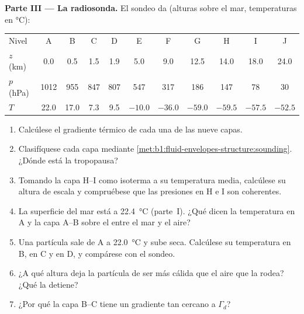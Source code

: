 \begin{problem}
\medskip
\noindent\textbf{Parte III --- La radiosonda.} El sondeo da (alturas sobre
el mar, temperaturas en \si{\celsius}):
\begin{center}
\small
\setlength{\tabcolsep}{4pt}
\begin{tabular}{|l|cccccccccc|}
\hline
Nivel & A & B & C & D & E & F & G & H & I & J \\
$z$ (km) & 0.0 & 0.5 & 1.5 & 1.9 & 5.0 & 9.0 & 12.5 & 14.0 & 18.0 & 24.0 \\
$p$ (hPa) & 1012 & 955 & 847 & 807 & 547 & 317 & 186 & 147 & 78 & 30 \\
$T$ & 22.0 & 17.0 & 7.3 & 9.5 & $-10.0$ & $-36.0$ & $-59.0$ & $-59.5$ & $-57.5$ & $-52.5$ \\
\hline
\end{tabular}
\end{center}
\begin{enumerate}[resume]
  \item Calcúlese el gradiente térmico de cada una de las nueve capas.
  \item Clasifíquese cada capa mediante \cref{met:b1:fluid-envelopes-structure:sounding}.
        ¿Dónde está la tropopausa?
  \item Tomando la capa H--I como isoterma a su temperatura media, calcúlese su altura de escala y compruébese que las presiones en H e I son coherentes.
  \item La superficie del mar está a \qty{22.4}{\celsius} (parte~I). ¿Qué dicen la temperatura en A y la capa A--B sobre el  entre el mar y el aire?
  \item Una partícula sale de A a \qty{22.0}{\celsius} y sube seca. Calcúlese su
        temperatura en B, en C y en D, y compárese con el sondeo.
  \item ¿A qué altura deja la partícula de ser más cálida que el aire que la rodea? ¿Qué la detiene?
  \item ¿Por qué la capa B--C tiene un gradiente tan cercano a $\Gamma_d$?
\end{enumerate}


\end{problem}
